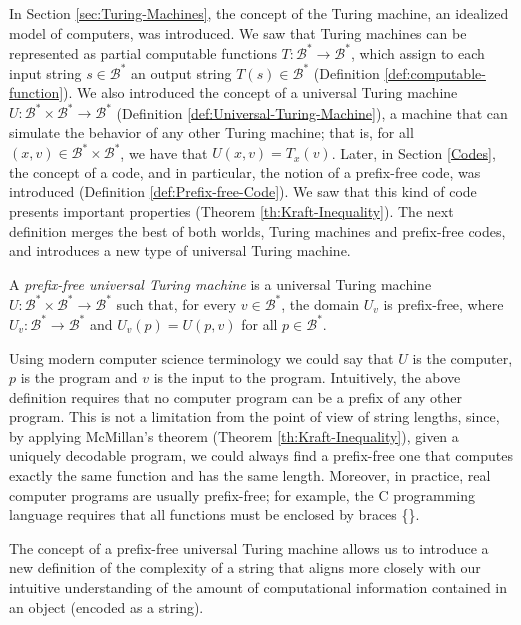 In Section \ref{sec:Turing-Machines}, the concept of the Turing machine, an idealized model of computers, was introduced. We saw that Turing machines can be represented as partial computable functions $T:\mathcal{B}^\ast \rightarrow \mathcal{B}^\ast$, which assign to each input string $s \in \mathcal{B}^\ast$ an output string $T(s) \in \mathcal{B}^\ast$ (Definition \ref{def:computable-function}). We also introduced the concept of a universal Turing machine $U:\mathcal{B}^\ast \times \mathcal{B}^\ast \rightarrow \mathcal{B}^\ast$ (Definition \ref{def:Universal-Turing-Machine}), a machine that can simulate the behavior of any other Turing machine; that is, for all $(x,v) \in  \mathcal{B}^\ast \times \mathcal{B}^\ast$, we have that $U(x,v) = T_{x}(v)$. Later, in Section \ref{Codes}, the concept of a code, and in particular, the notion of a prefix-free code, was introduced (Definition \ref{def:Prefix-free-Code}). We saw that this kind of code presents important properties (Theorem \ref{th:Kraft-Inequality}). The next definition merges the best of both worlds, Turing machines and prefix-free codes, and introduces a new type of universal Turing machine.

\begin{definition}
A \emph{prefix-free universal Turing machine} is a universal Turing machine $U:\mathcal{B}^\ast \times \mathcal{B}^\ast \rightarrow \mathcal{B}^\ast$ such that, for every $v \in \mathcal{B}^\ast$, the domain $U_{v}$ is prefix-free, where $U_{v}:\mathcal{B}^\ast \rightarrow \mathcal{B}^\ast$ and $U_{v}(p) = U(p, v)$ for all $p \in \mathcal{B}^\ast$.
\end{definition}

Using modern computer science terminology we could say that $U$ is the computer, $p$ is the program and $v$ is the input to the program. Intuitively, the above definition requires that no computer program can be a prefix of any other program. This is not a limitation from the point of view of string lengths, since, by applying McMillan's theorem (Theorem \ref{th:Kraft-Inequality}), given a uniquely decodable program, we could always find a prefix-free one that computes exactly the same function and has the same length. Moreover, in practice, real computer programs are usually prefix-free; for example, the C programming language requires that all functions must be enclosed by braces \{\}.

The concept of a prefix-free universal Turing machine allows us to introduce a new definition of the complexity of a string that aligns more closely with our intuitive understanding of the amount of computational information contained in an object (encoded as a string).

